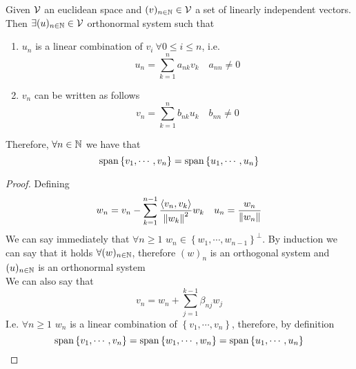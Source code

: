 \documentclass[../complete.tex]{subfiles}
\begin{document}
\begin{thm}
	Given $\mathcal{V}$ an euclidean space and $(v)_{n\in\mathbb{N}}\in\mathcal{V}$ a set of linearly independent vectors. Then $\exists(u)_{n\in\mathbb{N}}\in\mathcal{V}$ orthonormal system such that
	\begin{enumerate}
	\item $u_n$ is a linear combination of $v_i\ \forall0\le i\le n$, i.e.
		\begin{equation*}
			u_n=\sum_{k=1}^n a_{nk}v_k\quad a_{nn}\ne0
		\end{equation*}
	\item $v_n$ can be written as follows
		\begin{equation*}
			v_n=\sum_{k=1}^nb_{nk}u_k\quad b_{nn}\ne0
		\end{equation*}
	\end{enumerate}
	Therefore, $\forall n\in\mathbb{N}$ we have that
	\begin{equation*}
		\mathrm{span}\left\{ v_1,\cdots,v_n \right\}=\mathrm{span}\left\{ u_1,\cdots,u_n \right\}
	\end{equation*}
\end{thm}
\begin{proof}
	Defining
	\begin{equation*}
		w_n=v_n-\sum_{k=1}^{n-1}\frac{\langle v_n, v_k \rangle}{\norm{w_k}^2}w_k\quad u_n=\frac{w_n}{\norm{w_n}}
	\end{equation*}
	We can say immediately that $\forall n\ge1$ $w_n\in\left\{ w_1,\cdots,w_{n-1} \right\}^\perp$. By induction we can say that it holds $\forall(w)_{n\in\mathbb{N}}$, therefore $(w)_n$ is an orthogonal system and $(u)_{n\in\mathbb{N}}$ is an orthonormal system\\
	We can also say that
	\begin{equation*}
		v_n=w_n+\sum_{j=1}^{k-1}\beta_{nj}w_{j}
	\end{equation*}
	I.e. $\forall n\ge1$ $w_n$ is a linear combination of $\left\{ v_1,\cdots,v_n \right\}$, therefore, by definition
	\begin{equation*}
		\mathrm{span}\left\{ v_1,\cdots,v_n \right\}=\mathrm{span}\left\{ w_1,\cdots,w_n \right\}=\mathrm{span}\left\{ u_1,\cdots,u_n \right\}
	\end{equation*}
\end{proof}
\end{document}
